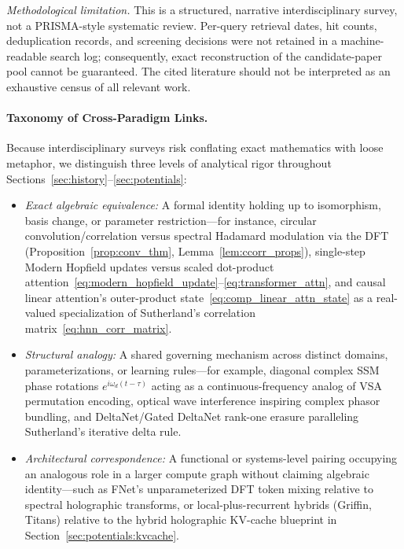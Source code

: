 \noindent\textit{Methodological limitation.} This is a structured, narrative interdisciplinary survey, not a PRISMA-style systematic review. Per-query retrieval dates, hit counts, deduplication records, and screening decisions were not retained in a machine-readable search log; consequently, exact reconstruction of the candidate-paper pool cannot be guaranteed. The cited literature should not be interpreted as an exhaustive census of all relevant work.

\paragraph{Taxonomy of Cross-Paradigm Links.}
Because interdisciplinary surveys risk conflating exact mathematics with loose metaphor, we distinguish three levels of analytical rigor throughout Sections~\ref{sec:history}--\ref{sec:potentials}:
\begin{itemize}
    \item \emph{Exact algebraic equivalence:} A formal identity holding up to isomorphism, basis change, or parameter restriction---for instance, circular convolution/correlation versus spectral Hadamard modulation via the DFT (Proposition~\ref{prop:conv_thm}, Lemma~\ref{lem:ccorr_props}), single-step Modern Hopfield updates versus scaled dot-product attention~\eqref{eq:modern_hopfield_update}--\eqref{eq:transformer_attn}, and causal linear attention's outer-product state~\eqref{eq:comp_linear_attn_state} as a real-valued specialization of Sutherland's correlation matrix~\eqref{eq:hnn_corr_matrix}.
    \item \emph{Structural analogy:} A shared governing mechanism across distinct domains, parameterizations, or learning rules---for example, diagonal complex SSM phase rotations $e^{i\omega_d(t-\tau)}$ acting as a continuous-frequency analog of VSA permutation encoding, optical wave interference inspiring complex phasor bundling, and DeltaNet/Gated DeltaNet rank-one erasure paralleling Sutherland's iterative delta rule.
    \item \emph{Architectural correspondence:} A functional or systems-level pairing occupying an analogous role in a larger compute graph without claiming algebraic identity---such as FNet's unparameterized DFT token mixing relative to spectral holographic transforms, or local-plus-recurrent hybrids (Griffin, Titans) relative to the hybrid holographic KV-cache blueprint in Section~\ref{sec:potentials:kvcache}.
\end{itemize}

